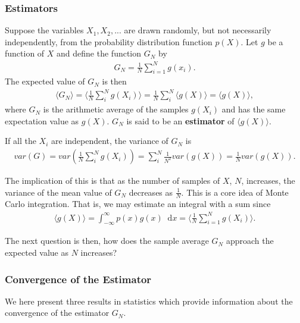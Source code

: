 \documentclass[twoside,english]{uiofysmaster}
\newcommand*\dif{\mathop{}\!\mathrm{d}}
\begin{document}
\subsubsection{Estimators}
Suppose the variables $X_1, X_2,...$ are drawn randomly, but not
necessarily independently, from the probability distribution function
$p(X)$. Let $g$ be a function of $X$ and define the function $G_N$ by
\begin{align}
	G_N = \frac{1}{N} \sum_{i=1}^N g(x_i).
\end{align}
The expected value of $G_N$ is then
\begin{align}
	\langle G_N \rangle = \langle \frac{1}{N} \sum_i^N g(X_i) \rangle = \frac{1}{N} \sum_i^N \langle g(X) \rangle = \langle g(X) \rangle,
\end{align} 
where $G_N$ is the arithmetic average of the samples $g(X_i)$ and has the same expectation value as $g(X)$. $G_N$ is said to be an \textbf{estimator} of $\langle g(X) \rangle$. 

If all the $X_i$ are independent, the variance of $G_N$ is
\begin{align}
	var(G) = var( \frac{1}{N} \sum_i^N g(X_i)  ) = \sum_i^N \frac{1}{N^2} var(g(X)) 
	= \frac{1}{N} var(g(X)).
\end{align}

The implication of this is that as the number of samples of $X$, $N$,
increases, the variance of the mean value of $G_N$ decreases as
$\frac{1}{N}$. This is a core idea of Monte Carlo integration. That
is, we may estimate an integral with a sum since
\begin{align}
	\langle g(X) \rangle = \int_{-\infty}^\infty p(x) g(x) \dif x = \langle \frac{1}{N} \sum_{i=1}^N g(X_i) \rangle .
\end{align}

The next question is then, how does the sample average $G_N$ approach the expected value as $N$ increases?


\subsubsection{Convergence of the Estimator}
We here present three results in statistics which provide information about the convergence of the estimator $G_N$.\cite{Kalos2008}
\end{document}
